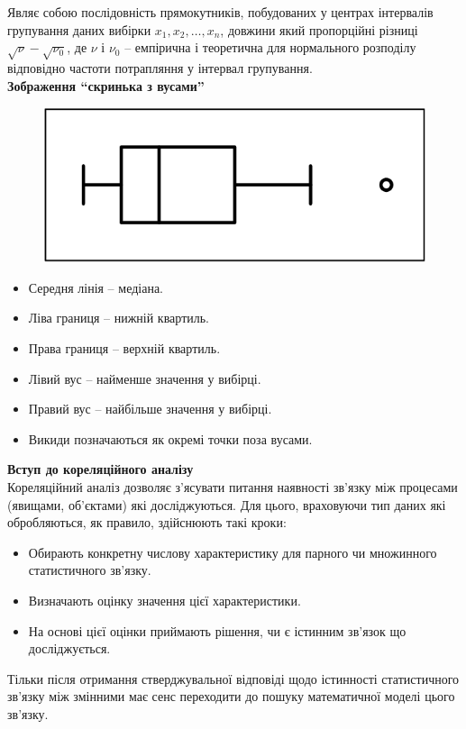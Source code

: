 Являє собою послідовність прямокутників, побудованих у центрах інтервалів групування даних вибірки $x_1, x_2, \ldots, x_n$, довжини який пропорційні різниці $\sqrt{\nu} - \sqrt{\nu_0}$, де $\nu$ і $\nu_0$ -- емпірична і теоретична для нормального розподілу відповідно частоти потрапляння у інтервал групування. \\

\textbf{Зображення ``скринька з вусами''}

\begin{figure}[H]
    \centering
    \includegraphics[width=.5\linewidth]{boxplot.png}
\end{figure}

\begin{itemize}
    \item Середня лінія -- медіана.
    \item Ліва границя -- нижній квартиль.
    \item Права границя -- верхній квартиль.
    \item Лівий вус -- найменше значення у вибірці.
    \item Правий вус -- найбільше значення у вибірці.
    \item Викиди позначаються як окремі точки поза вусами.
\end{itemize}

\textbf{Вступ до кореляційного аналізу} \\

Кореляційний аналіз дозволяє з'ясувати питання наявності зв'язку між процесами (явищами, об'єктами) які досліджуються. Для цього, враховуючи тип даних які обробляються, як правило, здійснюють такі кроки: 
\begin{itemize}
    \item Обирають конкретну числову характеристику для парного чи множинного статистичного зв'язку.
    \item Визначають оцінку значення цієї характеристики.
    \item На основі цієї оцінки приймають рішення, чи є істинним зв'язок що досліджується.
\end{itemize}

Тільки після отримання стверджувальної відповіді щодо істинності статистичного зв'язку між змінними має сенс переходити до пошуку математичної моделі цього зв'язку. \\


